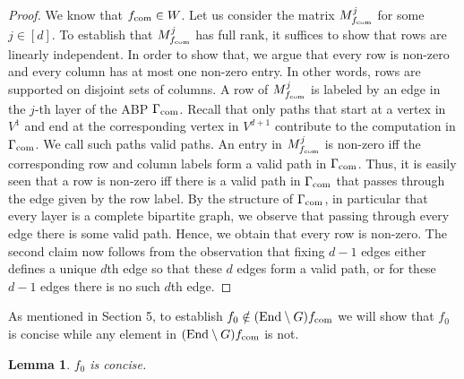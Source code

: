 \documentclass[10pt,a4paper]{article}
\newtheorem{lemma}[theorem]{Lemma}
\newcommand{\fcom}{f_{\rm com}}
\newcommand{\Gcom}{\Gamma_{\rm com}}
\newcommand{\End}{\mathrm{End}}
\begin{document}
\begin{proof}
We know that $\fcom\in W$. Let us consider the matrix $M^j_{\fcom}$ for some $j\in[d]$. To establish that $M^j_{\fcom}$ has full rank, it suffices to show that rows are linearly independent. In order to show that, we argue that every row is non-zero and every column has at most one non-zero entry. In other words, rows are supported on disjoint sets of columns.
A row of $M^j_{\fcom}$ is labeled by an edge in the $j$-th layer of the ABP $\Gcom$. Recall that only paths that start at a vertex in $V^1$ and end at the corresponding vertex in $V^{d+1}$ contribute to the computation in $\Gcom$. We call such paths valid paths. An entry in $M^j_{\fcom}$ is non-zero iff the corresponding row and column labels form a valid path in $\Gcom$. Thus, it is easily seen that a row is non-zero iff there is a valid path in $\Gcom$ that passes through the edge given by the row label. By the structure of $\Gcom$, in particular that every layer is a complete bipartite graph, we observe that passing through every edge there is some valid path. Hence, we obtain that every row is non-zero.
The second claim now follows from the observation that fixing $d-1$ edges either defines a unique $d$th edge so that these $d$ edges form a valid path, or for these $d-1$ edges there is no such $d$th edge.
\end{proof}
As mentioned in Section 5, to establish $f_0\notin(\End\setminus G)\fcom$ we will show that $f_0$ is concise while any element in $(\End\setminus G)\fcom$ is not.
\begin{lemma}$f_0$ is concise.\end{lemma}
\end{document}

